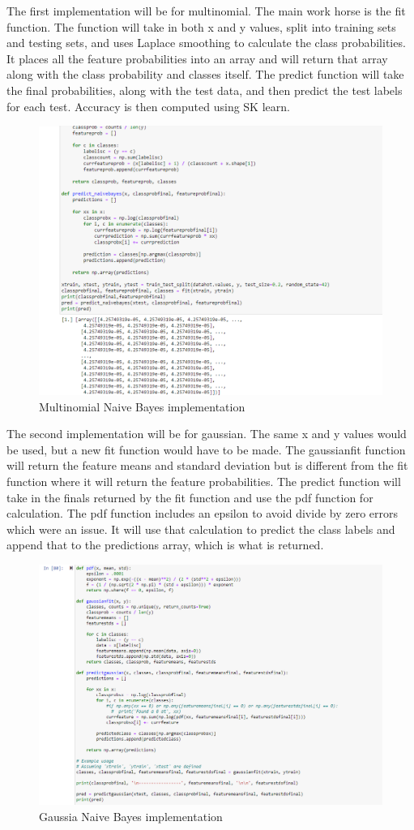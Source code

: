 \documentclass{article}
\begin{document}
The first implementation will be for multinomial. The main work horse is the fit function. The function will take in both x and y values, split into training sets and testing sets, and uses Laplace smoothing to calculate the class probabilities. It places all the feature probabilities into an array and will return that array along with the class probability and classes itself. The predict function will take the final probabilities, along with the test data, and then predict the test labels for each test. Accuracy is then computed using SK learn.

\begin{figure}
    \centering
    \includegraphics[width=0.5\linewidth]{5.png}
    \caption{Multinomial Naive Bayes implementation}
    \label{fig:enter-label}
\end{figure}

The second implementation will be for gaussian. The same x and y values would be used, but a new fit function would have to be made. The gaussianfit function will return the feature means and standard deviation but is different from the fit function where it will return the feature probabilities. The predict function will take in the finals returned by the fit function and use the pdf function for calculation. The pdf function includes an epsilon to avoid divide by zero errors which were an issue. It will use that calculation to predict the class labels and append that to the predictions array, which is what is returned.
\begin{figure}
    \centering
    \includegraphics[width=0.5\linewidth]{6.png}
    \caption{Gaussia Naive Bayes implementation}
    \label{fig:enter-label}
\end{figure}
\end{document}
